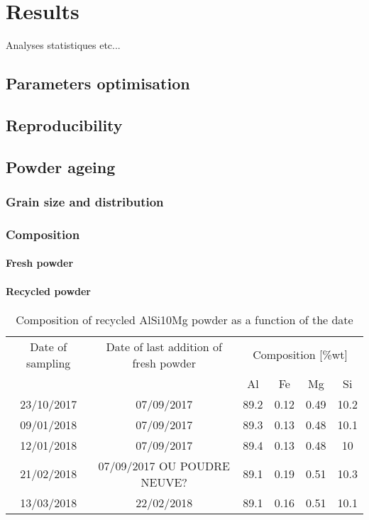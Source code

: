 \chapter{Results}
\label{Chap4}
Analyses statistiques etc...
\section{Parameters optimisation}

\section{Reproducibility}

\section{Powder ageing}

\subsection{Grain size and distribution}

\subsection{Composition}

\subsubsection{Fresh powder}

\subsubsection{Recycled powder}
 \begin{center}
\begin{table}[ht]
\begin{tabular}{|c|c |c |c| c|c|}
    \hline
    Date of sampling& Date of last addition of fresh powder & \multicolumn{4}{c}{Composition [\%wt]} \vline\\
    \cline{3-6}
    & & Al& Fe&Mg&Si\\
\hline 
\hline   
    23/10/2017 & 07/09/2017 &89.2&0.12&0.49&10.2\\
    09/01/2018 & 07/09/2017 & 89.3 & 0.13 &0.48&10.1\\
    12/01/2018 & 07/09/2017 & 89.4 & 0.13 &0.48&10\\
    21/02/2018& 07/09/2017 OU POUDRE NEUVE? &89.1&0.19&0.51&10.3\\
    13/03/2018& 22/02/2018 &89.1&0.16&0.51&10.1\\    
    \hline
\end{tabular}
\label{tab:compo}
\caption[Composition of recycled AlSi10Mg powder as a function of the date]{Composition of recycled AlSi10Mg powder as a function of the date}
\end{table}
 \end{center}

